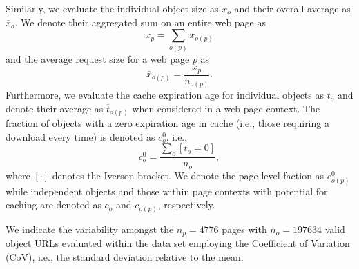 \documentclass[letterpaper,conference]{IEEEtran}
\begin{document}
Similarly, we evaluate the individual object size as $x_o$ and their overall average as $\overline{x}_o$.
We denote their aggregated sum on an entire web page as 
\begin{equation*}
x_{p}=\sum_{o(p)} x_{o(p)}
\end{equation*}
and the average request size for a web page $p$ as  
\begin{equation*}
\overline{x}_{o(p)}=\frac{x_{p}}{n_{o(p)}}.
\end{equation*}
Furthermore, we evaluate the cache expiration age for individual objects as $t_o$ and denote their average as $\overline{t}_{o(p)}$ when considered in a web page context. 
The fraction of objects with a zero expiration age in cache (i.e., those requiring a download every time) is denoted as $c^0_o$, i.e., 
\begin{equation*}
c^0_o=\frac{\sum_o [t_o = 0]}{n_o},
\end{equation*}
where $[\cdot]$ denotes the Iverson bracket.
We denote the page level faction as $c^0_{o(p)}$ while independent objects and those within page contexts with potential for caching are denoted as $c_o$ and $c_{o(p)}$, respectively.

We indicate the variability amongst the $n_p=4776$ pages with $n_{o}=197634$ valid object URLs evaluated within the data set employing the Coefficient of Variation (CoV), i.e., the standard deviation relative to the mean. 
\end{document}
